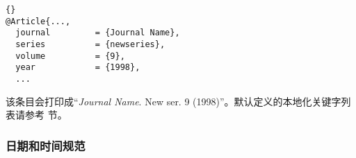 \begin{lstlisting}[style=bibtex]{}
@Article{...,
  journal         = {Journal Name},
  series          = {newseries},
  volume          = {9},
  year            = {1998},
  ...
\end{lstlisting}
%
该条目会打印成“\emph{Journal Name}. New ser. 9 (1998)”。默认定义的本地化关键字列表请参考  节。

\subsubsection{日期和时间规范}%
\label{bib:use:dat}


